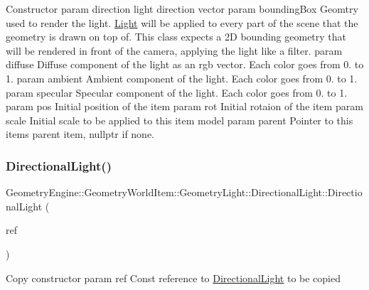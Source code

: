 Constructor param direction light direction vector param bounding\+Box Geomtry used to render the light. \mbox{\hyperlink{class_geometry_engine_1_1_geometry_world_item_1_1_geometry_light_1_1_light}{Light}} will be applied to every part of the scene that the geometry is drawn on top of. This class expects a 2D bounding geometry that will be rendered in front of the camera, applying the light like a filter. param diffuse Diffuse component of the light as an rgb vector. Each color goes from 0. to 1. param ambient Ambient component of the light. Each color goes from 0. to 1. param specular Specular component of the light. Each color goes from 0. to 1. param pos Initial position of the item param rot Initial rotaion of the item param scale Initial scale to be applied to this item model param parent Pointer to this items parent item, nullptr if none. \mbox{\label{class_geometry_engine_1_1_geometry_world_item_1_1_geometry_light_1_1_directional_light_a51bac310074f6315122e23c2d9e28d6f}} 
\subsubsection{\texorpdfstring{DirectionalLight()}{DirectionalLight()}\hspace{0.1cm}{\footnotesize\ttfamily [2/2]}}
{\footnotesize\ttfamily Geometry\+Engine\+::\+Geometry\+World\+Item\+::\+Geometry\+Light\+::\+Directional\+Light\+::\+Directional\+Light (\begin{DoxyParamCaption}\item[{const \mbox{\hyperlink{class_geometry_engine_1_1_geometry_world_item_1_1_geometry_light_1_1_directional_light}{Directional\+Light}} \&}]{ref }\end{DoxyParamCaption})\hspace{0.3cm}{\ttfamily [inline]}}

Copy constructor param ref Const reference to \mbox{\hyperlink{class_geometry_engine_1_1_geometry_world_item_1_1_geometry_light_1_1_directional_light}{Directional\+Light}} to be copied 

